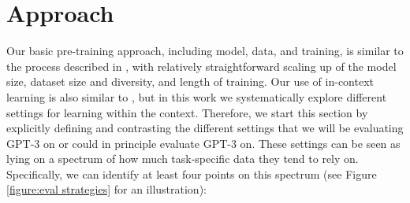 \section{Approach}
\label{section:Approach}

Our basic pre-training approach, including model, data, and training, is similar to the process described in \cite{radford2019language}, with relatively straightforward scaling up of the model size, dataset size and diversity, and length of training.  Our use of in-context learning is also similar to \cite{radford2019language}, but in this work we systematically explore different settings for learning within the context.  Therefore, we start this section by explicitly defining and contrasting the different settings that we will be evaluating GPT-3 on or could in principle evaluate GPT-3 on. These settings can be seen as lying on a spectrum of how much task-specific data they tend to rely on.  Specifically, we can identify at least four points on this spectrum (see Figure \ref{figure:eval strategies} for an illustration):

